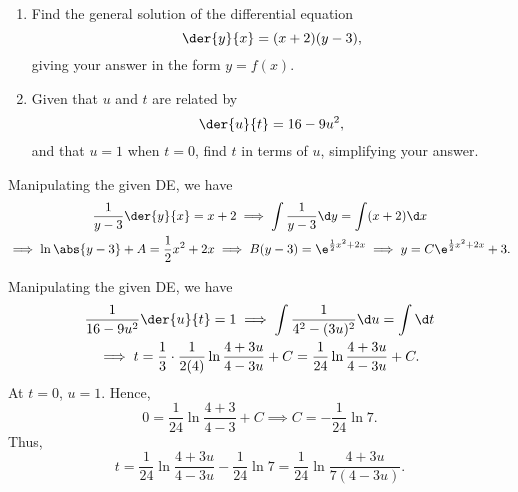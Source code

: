 \clearpage
\begin{problem}
    \begin{enumerate}
        \item Find the general solution of the differential equation \[\der{y}{x} = (x+2)(y-3),\] giving your answer in the form $y = f(x)$.
        \item Given that $u$ and $t$ are related by \[\der{u}{t} = 16 - 9u^2,\] and that $u = 1$ when $t = 0$, find $t$ in terms of $u$, simplifying your answer.
    \end{enumerate}
\end{problem}
\begin{solution}
    \begin{ppart}
        Manipulating the given DE, we have
        \begin{gather*}
            \frac{1}{y-3} \der{y}{x} = x+2 \implies \int \frac1{y-3} \d y = \int (x+2) \d x
            \\\implies \ln \abs{y-3} + A = \frac12x^2 + 2x \implies B(y-3) = \e^{\frac12x^2 + 2x} \implies y = C\e^{\frac12x^2 + 2x} + 3.
        \end{gather*}
    \end{ppart}
    \begin{ppart}
        Manipulating the given DE, we have
        \begin{gather*}
            \frac1{16-9u^2} \der{u}{t} = 1 \implies \int \frac1{4^2 - (3u)^2} \d u = \int \d t\\
            \implies t = \frac13 \cdot \frac1{2(4)} \ln{\frac{4 + 3u}{4 - 3u}} + C = \frac{1}{24} \ln{\frac{4 + 3u}{4 - 3u}} + C.
        \end{gather*}
        At $t=0$, $u = 1$. Hence, \[0 = \frac1{24} \ln{\frac{4 + 3}{4 - 3}} + C \implies C = -\frac1{24} \ln 7.\] Thus, \[t = \frac{1}{24} \ln{\frac{4 + 3u}{4 - 3u}} - \frac1{24} \ln 7 = \frac1{24} \ln{\frac{4+3u}{7(4-3u)}}.\]
    \end{ppart}
\end{solution}

